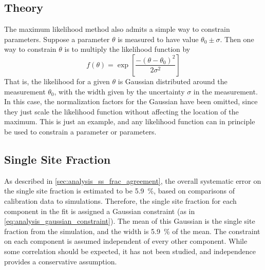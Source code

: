 \documentclass[herrin-thesis.tex]{subfiles}
\begin{document}
\subsection{Theory}
The maximum likelihood method also admits a simple way to constrain parameters. Suppose a parameter \(\theta\) is measured to have value \(\theta_0 \pm \sigma\). Then one way to constrain \(\theta\) is to multiply the likelihood function by
\begin{equation}
f(\theta) = \exp\left[\frac{-(\theta-\theta_0)^2}{2\sigma^2}\right]
\label{eq:analysis_gaussian_constraint}
\end{equation}
That is, the likelihood for a given \(\theta\) is Gaussian distributed around the measurement \(\theta_0\), with the width given by the uncertainty \(\sigma\) in the measurement. In this case, the normalization factors for the Gaussian have been omitted, since they just scale the likelihood function without affecting the location of the maximum. This is just an example, and any likelihood function can in principle be used to constrain a parameter or parameters.

\subsection{Single Site Fraction}
As described in \cref{sec:analysis_ss_frac_agreement}, the overall systematic error on the single site fraction is estimated to be \SI{5.9}{\percent}, based on comparisons of calibration data to simulations. Therefore, the single site fraction for each component in the fit is assigned a Gaussian constraint (as in \cref{eq:analysis_gaussian_constraint}). The mean of this Gaussian is the single site fraction from the simulation, and the width is \SI{5.9}{\percent} of the mean. The constraint on each component is assumed independent of every other component. While some correlation should be expected, it has not been studied, and independence provides a conservative assumption.
\end{document}
